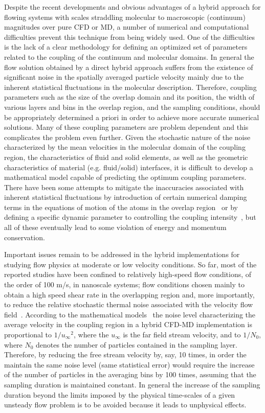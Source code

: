 \documentclass[preprint,12pt]{elsarticle}
\begin{document}
Despite the recent developments and obvious advantages of a hybrid approach for flowing systems with scales straddling molecular to macroscopic (continuum) magnitudes over pure CFD or MD, a number of numerical and computational difficulties prevent this technique from being widely used.
One of the difficulties is the lack of a clear methodology for defining an optimized set of parameters related to the coupling of the continuum and molecular domains. 
In general the flow solution obtained by a direct hybrid approach suffers from the existence of significant noise in the spatially averaged particle velocity mainly due to the inherent statistical fluctuations in the molecular description. Therefore, coupling parameters such as the size of the overlap domain and its position, the width of various layers and bins in the overlap region, and the sampling conditions, should be appropriately determined a priori in order to achieve more accurate numerical solutions.
Many of these coupling parameters are problem dependent and this complicates the problem even further. 
Given the stochastic nature of the noise characterized by the mean velocities in the molecular domain of the coupling region, the characteristics of fluid and solid elements, as well as the geometric characteristics of material (e.g. fluid/solid) interfaces, it is difficult to develop a mathematical model capable of predicting the optimum coupling parameters. 
There have been some attempts to mitigate the inaccuracies associated with inherent statistical fluctuations by introduction of certain numerical damping terms in the equations of motion of the atoms in the overlap region~\cite{Thompson,Cui} or by defining a specific dynamic parameter to controlling the coupling intensity~\cite{Wang}, but all of these eventually lead to some violation of energy and momentum conservation. 


Important issues remain to be addressed in the hybrid implementations for studying flow physics at moderate or low velocity conditions.  So far, most of the reported studies have been confined to relatively high-speed flow conditions, of the order of 100 m/s, in nanoscale systems; flow conditions chosen mainly to obtain a high speed shear rate in the overlapping region and, more importantly, to reduce the relative stochastic thermal noise associated with the velocity flow field~\cite{Yen}. According to the mathematical models~\cite{Hadjicon3,Time_Mechanism} the noise level characterizing the average velocity in the coupling region in a hybrid CFD-MD implementation is proportional to ${{1} / {{u}_{\infty}}^2}$, where the ${u_{\infty}}$ is the far field stream velocity, and to ${{1} / {N_0}}$, where ${N_0}$ denotes the number of particles contained in the sampling layer. Therefore, by reducing the free stream velocity by, say, 10 times, in order the maintain the same noise level (same statistical error)  would require the increase of the number of particles in the averaging bins by 100 times, assuming that the sampling duration is maintained constant. In general the increase of the sampling duration beyond the limits imposed by the physical time-scales of a given unsteady flow problem is to be avoided because it leads to unphysical effects.
\end{document}
